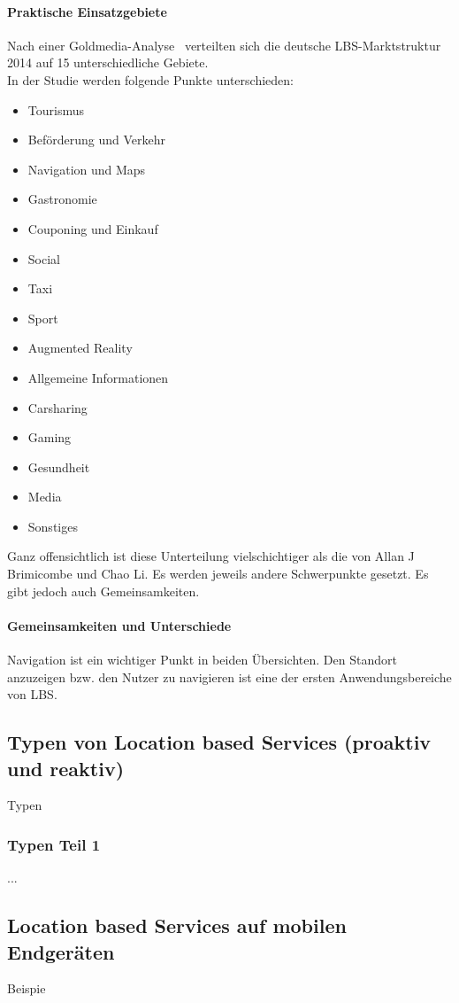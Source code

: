 \paragraph{Praktische Einsatzgebiete}
Nach einer Goldmedia-Analyse~\cite[S.9]{goldmedia:lbs} verteilten sich die deutsche LBS-Marktstruktur 2014 auf 15 unterschiedliche Gebiete.\\
In der Studie werden folgende Punkte unterschieden:
\begin{itemize}
	\item Tourismus
	\item Beförderung und Verkehr
	\item Navigation und Maps
	\item Gastronomie
	\item Couponing und Einkauf
	\item Social
	\item Taxi
	\item Sport
	\item Augmented Reality
	\item Allgemeine Informationen
	\item Carsharing
	\item Gaming
	\item Gesundheit
	\item Media
	\item Sonstiges
\end{itemize}
Ganz offensichtlich ist diese Unterteilung vielschichtiger als die von Allan J Brimicombe und Chao Li. Es werden jeweils andere Schwerpunkte gesetzt. Es gibt jedoch auch Gemeinsamkeiten.

\paragraph{Gemeinsamkeiten und Unterschiede}
Navigation ist ein wichtiger Punkt in beiden Übersichten. Den Standort anzuzeigen bzw. den Nutzer zu navigieren ist eine der ersten Anwendungsbereiche von LBS.
	\subsection{Typen von Location based Services (proaktiv und reaktiv)}
Typen
	\subsubsection{Typen Teil 1}
...
	\subsection{Location based Services auf mobilen Endgeräten}
Beispie

